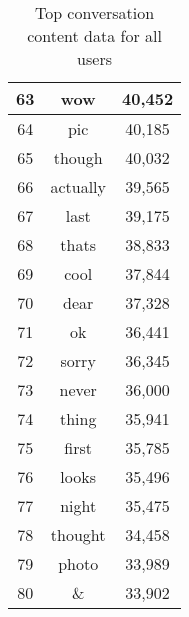 \begin{table}[!htbp]
\begin{minipage}[b]{.5\textwidth}
\begin{tabular}{|c|c|c|}
		63 & wow & 40,452 \\ \hline
		64 & pic & 40,185 \\ \hline
		65 & though & 40,032 \\ \hline
		66 & actually & 39,565 \\ \hline
		67 & last & 39,175 \\ \hline
		68 & thats & 38,833 \\ \hline
		69 & cool & 37,844 \\ \hline
		70 & dear & 37,328 \\ \hline
		71 & ok & 36,441 \\ \hline
		72 & sorry & 36,345 \\ \hline
		73 & never & 36,000 \\ \hline
		74 & thing & 35,941 \\ \hline
		75 & first & 35,785 \\ \hline
		76 & looks & 35,496 \\ \hline
		77 & night & 35,475 \\ \hline
		78 & thought & 34,458 \\ \hline
		79 & photo & 33,989 \\ \hline
		80 & \& & 33,902 \\ \hline
	\end{tabular}
\end{minipage}
	\caption{Top conversation content data for all users}
	\label{tab:revpol}
\end{table}


